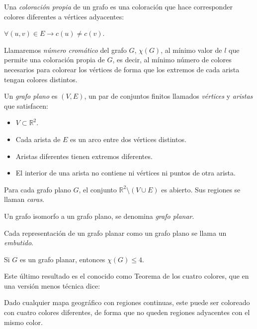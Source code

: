 \begin{definition}
	Una \textit{coloración propia} de un grafo es una coloración que hace corresponder colores diferentes a vértices adyacentes:

	$\forall (u,v)\in E \to c(u)\neq c(v)$.
\end{definition}


\begin{definition}
	Llamaremos \textit{número cromático} del grafo $G$, $\chi(G)$, al mínimo valor de $l$ que permite una coloración propia de $G$, es decir, al mínimo número de colores necesarios para colorear los vértices de forma que los extremos de cada arista tengan colores distintos.
\end{definition}


\begin{definition}
	Un \textit{grafo plano} es $(V,E)$, un par de conjuntos finitos llamados \textit{vértices} y \textit{aristas} que satisfacen:
	\begin{itemize}
		\item $V \subset \mathbb{R}^2$.
		\item Cada arista de $E$ es un arco entre dos vértices distintos.
		\item Aristas diferentes tienen extremos diferentes.
		\item El interior de una arista no contiene ni vértices ni puntos de otra arista.
	\end{itemize}

	Para cada grafo plano $G$, el conjunto $\mathbb{R}^2\setminus (V\cup E) $ es abierto. Sus regiones se llaman \textit{caras}.
\end{definition}

\begin{definition}
	Un grafo isomorfo a un grafo plano, se denomina \textit{grafo planar}.
	
	Cada representación de un grafo planar como un grafo plano se llama un \textit{embutido}.
\end{definition}

\begin{theorem}
	Si $G$ es un grafo planar, entonces $\chi(G) \leq 4$.
\end{theorem}

Este último resultado es el conocido como Teorema de los cuatro colores, que en una versión menos técnica dice:

\begin{theorem}
	Dado cualquier mapa geográfico con regiones continuas, este puede ser coloreado con cuatro colores diferentes, de forma que no queden regiones adyacentes con el mismo color.
\end{theorem}


